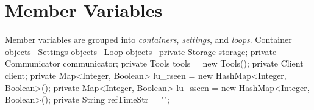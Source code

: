 \section{Member Variables}
Member variables are grouped into \emph{containers}, \emph{settings}, and
\emph{loops}.
\nwenddocs{}\endmoddef{}
\LA{}Container objects~{\nwtagstyle{}}\RA{}
\LA{}Settings objects~{\nwtagstyle{}}\RA{}
\LA{}Loop objects~{\nwtagstyle{}}\RA{}
\nwendcode{}\nwdocspar
{}
\nwenddocs{}\endmoddef{}
private Storage storage;
private Communicator communicator;
private Tools tools = new Tools();
private Client client;
private Map<Integer, Boolean> lu_rseen = new HashMap<Integer, Boolean>();
private Map<Integer, Boolean> lu_sseen = new HashMap<Integer, Boolean>();
private String refTimeStr = "";
\nwendcode{}\nwdocspar

